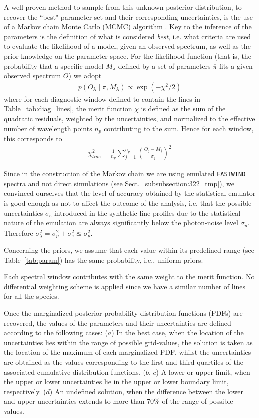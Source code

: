 \documentclass{aa}
\begin{document}
A well-proven method to sample from this unknown posterior distribution, to recover the ``best" parameter set and their corresponding uncertainties, is the use of a Markov chain Monte Carlo (MCMC) algorithm \citep{metropolis53, siddhartha01}. Key to the inference of the parameters is the definition of what is considered {\it best}, i.e. what criteria are used to evaluate the likelihood of a model, given an observed spectrum, as well as the prior knowledge on the parameter space. For the likelihood function (that is, the probability that a specific model $M_\lambda$ defined by a set of parameters $\overline{\pi}$ fits a given observed spectrum $O$) we adopt \citep{mackay03}
%
\begin{align*}
p\left(O_\lambda \mid \overline{\pi}, M_\lambda\right) \propto \exp{\left(-\chi^2 / 2\right)}
\end{align*}
%
where for each diagnostic window defined to contain the lines in Table~\ref{tab:diag_lines}, the merit function $\chi$ is defined as the sum of the quadratic residuals, weighted by the uncertainties, and normalized to the effective number of wavelength points $n_p$ contributing to the sum. Hence for each window, this corresponds to
%
\begin{align*}
\chi_{line}^2=\frac{1}{n_p} \sum_{j=1}^{n_p}\left(\frac{O_j-M_j}{\sigma_j}\right)^2
\end{align*}

Since in the construction of the Markov chain we are using emulated {\tt FASTWIND} spectra and not direct simulations (see Sect.~\ref{subsubsection:322_tmp}), we convinced ourselves that the level of accuracy obtained by the statistical emulator is good enough as not to affect the outcome of the analysis, i.e. that the possible uncertainties $\sigma_e$ introduced in the synthetic line profiles due to the statistical nature of the emulation are always significantly below the photon-noise level $\sigma_p$. Therefore $\sigma_\lambda^2 = \sigma^2_p + \sigma^2_e \approxeq \sigma^2_p$. 

Concerning the priors, we assume that each value within its predefined range (see Table~\ref{tab:param}) has the same probability, i.e., uniform priors.

Each spectral window contributes with the same weight to the merit function. No differential weighting scheme is applied since we have a similar number of lines for all the species.

Once the marginalized posterior probability distribution functions (PDFs) are recovered, the values of the parameters and their uncertainties are defined according to the following cases:
($a$) In the best case, when the location of the uncertainties lies within the range of possible grid-values, the solution is taken as the location of the maximum of each marginalized PDF, whilst the uncertainties are obtained as the values corresponding to the first and third quartiles of the associated cumulative distribution functions.
($b$, $c$) A lower or upper limit, when the upper or lower uncertainties lie in the upper or lower boundary limit, respectively.
($d$) An undefined solution, when the difference between the lower and upper uncertainties extends to more than 70\% of the range of possible values. 
\end{document}
